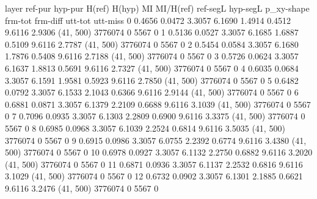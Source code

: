 layer     ref-pur    hyp-pur    H(ref)    H(hyp)      MI    MI/H(ref)    ref-segL    hyp-segL  p_xy-shape      frm-tot    frm-diff    utt-tot    utt-miss
0          0.4656     0.0472    3.3057    6.1690  1.4914       0.4512      9.6116      2.9306  (41, 500)       3776074           0       5567           0
1          0.5136     0.0527    3.3057    6.1685  1.6887       0.5109      9.6116      2.7787  (41, 500)       3776074           0       5567           0
2          0.5454     0.0584    3.3057    6.1680  1.7876       0.5408      9.6116      2.7188  (41, 500)       3776074           0       5567           0
3          0.5726     0.0624    3.3057    6.1637  1.8813       0.5691      9.6116      2.7327  (41, 500)       3776074           0       5567           0
4          0.6035     0.0684    3.3057    6.1591  1.9581       0.5923      9.6116      2.7850  (41, 500)       3776074           0       5567           0
5          0.6482     0.0792    3.3057    6.1533  2.1043       0.6366      9.6116      2.9144  (41, 500)       3776074           0       5567           0
6          0.6881     0.0871    3.3057    6.1379  2.2109       0.6688      9.6116      3.1039  (41, 500)       3776074           0       5567           0
7          0.7096     0.0935    3.3057    6.1303  2.2809       0.6900      9.6116      3.3375  (41, 500)       3776074           0       5567           0
8          0.6985     0.0968    3.3057    6.1039  2.2524       0.6814      9.6116      3.5035  (41, 500)       3776074           0       5567           0
9          0.6915     0.0986    3.3057    6.0755  2.2392       0.6774      9.6116      3.4380  (41, 500)       3776074           0       5567           0
10         0.6978     0.0927    3.3057    6.1132  2.2750       0.6882      9.6116      3.2020  (41, 500)       3776074           0       5567           0
11         0.6871     0.0936    3.3057    6.1137  2.2532       0.6816      9.6116      3.1029  (41, 500)       3776074           0       5567           0
12         0.6732     0.0902    3.3057    6.1301  2.1885       0.6621      9.6116      3.2476  (41, 500)       3776074           0       5567           0
